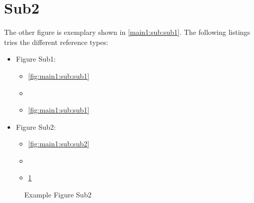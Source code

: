 \section[Sub2]{Sub2}\label{main1:sub:sub2}

The other figure is exemplary shown in \autoref{main1:sub:sub1}. The following listings tries the different reference types:
\begin{itemize}
	\item Figure Sub1:
		\begin{itemize}
			\item \autoref{fig:main1:sub:sub1}
			\item {}
			\item \ref{fig:main1:sub:sub1}
		\end{itemize}
	\item Figure Sub2:
		\begin{itemize}
			\item \autoref{fig:main1:sub:sub2}
			\item {}
			\item \ref{fig:main1:sub:sub2}
		\end{itemize}
\end{itemize}


\begin{figure}[!h]
	\caption[{Main1; Sub; Sub2}]{Example Figure Sub2}
	\label{fig:main1:sub:sub2}
\end{figure}

